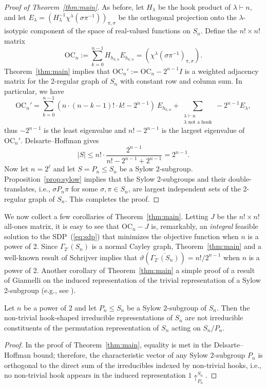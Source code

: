 \documentclass[12pt]{article}
\begin{document}
\begin{proof}[Proof of Theorem~\ref{thm:main}]
\noindent As before, let $H_\lambda$ be the hook product of $\lambda \vdash n$, and let $E_\lambda = (H_\lambda^{-1} \chi^\lambda(\sigma \pi^{-1}))_{\pi,\sigma}$ be the orthogonal projection onto the $\lambda$-isotypic component of the space of real-valued functions on $S_n$. Define the $n! \times n!$ matrix 
\[
	\mathrm{OC}_n := \sum_{k=0}^{n-1} H_{h_{k,n}} E_{h_{k,n}} = (\chi^\lambda(\sigma \pi^{-1})_{\pi,\sigma}).
\]
Theorem~\ref{thm:main} implies that $\mathrm{OC}_n' := \mathrm{OC}_n - 2^{n-1}I$ is a weighted adjacency matrix for the 2-regular graph of $S_n$ with constant row and column sum. In particular, we have
\[
	\mathrm{OC}_n' = \sum_{k=0}^{n-1} (n \cdot (n-k-1)! \cdot k! - 2^{n-1})~E_{h_{k,n}} + \sum_{\substack{\lambda \vdash n \\ \lambda \text{ not a hook}}} -2^{n-1}E_\lambda,
\]
thus $-2^{n-1}$ is the least eigenvalue and $n! - 2^{n-1}$ is the largest eigenvalue of $\mathrm{OC}_n'$. Delsarte--Hoffman gives
\[
	|S| \leq n! \cdot \frac{2^{n-1}}{n! - 2^{n-1} + 2^{n-1}} = 2^{n-1}.
\]
Now let $n = 2^\ell$ and let $S = P_n \leq S_n$ be a Sylow 2-subgroup. Proposition~\ref{prop:sylow} implies that the Sylow 2-subgroups and their double-translates, i.e., $\sigma P_n \pi$ for some $\sigma, \pi \in S_{n}$, are largest independent sets of the 2-regular graph of $S_{n}$. This completes the proof.
\end{proof}
We now collect a few corollaries of Theorem~\ref{thm:main}.
\noindent Letting $J$ be the $n! \times n!$ all-ones matrix, it is easy to see that $\mathrm{OC}_n - J$ is, remarkably,  an \emph{integral} feasible solution to the SDP~(\ref{eq:sdp}) that minimizes the objective function when $n$ is a power of 2. Since $\Gamma_{2'}(S_{n})$ is a normal Cayley graph, Theorem~\ref{thm:main} and a well-known result of Schrijver implies that $\vartheta(\overline{\Gamma_{2'}(S_{n})}) = n!/2^{n-1}$ when $n$ is a power of 2. Another corollary of Theorem~\ref{thm:main} a simple proof of a result of Giannelli on the induced representation of the trivial representation of a Sylow 2-subgroup (e.g., see \cite[Prop 3.5]{StaceyO23}).
\begin{corollary}
Let $n$ be a power of 2 and let $P_n \leq S_n$ be a Sylow $2$-subgroup of $S_n$. Then the non-trivial hook-shaped irreducible representations of $S_n$ are not irreducible constituents of the permutation representation of $S_n$ acting on $S_n/P_n$.
\end{corollary}
\begin{proof}
In the proof of Theorem~\ref{thm:main}, equality is met in the Delsarte--Hoffman bound; therefore, the characteristic vector of any Sylow 2-subgroup $P_n$ is orthogonal to the direct sum of the irreducibles indexed by non-trivial hooks, i.e., no non-trivial hook appears in the induced representation $1 \uparrow_{P_n}^{S_n}$.
\end{proof}
\noindent 
\end{document}
